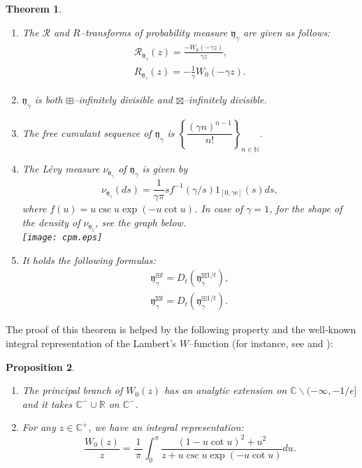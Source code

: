 \documentclass[12pt]{amsart}
\newtheorem{thm}{Theorem}[section]
\newtheorem{prop}[thm]{Proposition}
\theoremstyle{definition}
\numberwithin{equation}{section}
\begin{document}
\begin{thm}
\begin{enumerate}
	\item[\rm{(1)}] The $\mathcal{R}$ and $R$--transforms
	of probability measure $\mathfrak{y}_{\gamma}$ 
	are given as follows:
	\begin{align*}
	&\mathcal{R}_{\mathfrak{y}_{\gamma}}(z) 
	=\frac{-W_{0}(-\gamma z)}{\gamma z},&\\
	&R_{\mathfrak{y}_{\gamma}}(z) = -\frac{1}{\gamma}W_{0}(-\gamma z) .&
	\end{align*}

	\item[\rm{(2)}]
	$\mathfrak{y}_{\gamma}$ is both $\boxplus$--infinitely divisible and $\boxtimes$--infinitely divisible.
	\item[\rm{(3)}]
	The free cumulant sequence of 
	$\mathfrak{y_{\gamma}}$ is $\left\{ \dfrac{(\gamma n)^{n-1}}{n!}\right\}_{n\in{\mathbb{N}}}$.

	\item[\rm{(4)}]
	
	The L\'evy measure $\nu_{\mathfrak{y}_{\gamma}}$ 
	of $\mathfrak{y}_{\gamma}$ is given by
		\[
		\nu_{\mathfrak{y}_{\gamma}}(ds) 
		=\frac{1}{\gamma\pi}sf^{-1}(\gamma /s)1_{[0,\gamma \mathrm{e}]}(s)ds,
		\] 
		where $f(u)=u\csc u \exp (-u\cot u)$.
		In case of $\gamma=1$, 
		for the shape of the density of 
		$\nu_{\mathfrak{y}_{1}}$,
		 see the graph below.\\
	\texttt{[image: cpm.eps]}\\
	\item[\rm{(5)}]
	It holds the following formulas:
	\begin{align*}
	&\mathfrak{y}_{\gamma}^{\boxplus t}
	= D_{t}(\mathfrak{y}_{\gamma}^{\boxtimes 1/t}),&\\
	&\mathfrak{y}_{\gamma}^{\boxtimes t} 
	= D_{t}(\mathfrak{y}_{\gamma}^{\boxplus 1/t}).&
	\end{align*}
\end{enumerate}
\end{thm}
The proof of this theorem is helped by 
the following property and the well-known integral representation of 
the Lambert's $W$--function (for instance, see \cite[Section 4]{Cetc96} and \cite[Theorem 3.1]{KJCB11}):
\begin{prop}\label{int}
\begin{enumerate}[{\rm (1)}]
\item
The principal branch of $W_{0}(z)$ has an analytic extension on $\mathbb{C} \backslash (-\infty, -1/e]$ 
and it takes ${\mathbb{C}}^- \cup {\mathbb{R}}$ on ${\mathbb{C}}^{-}$.  
\item
For any $z \in {\mathbb{C}}^{+}$, we have an integral representation:
\[
\frac{W_{0}(z)}{z}
=\dfrac{1}{\, \pi \, }
\int_{0}^{\pi}\frac{(1-u\cot u)^2+u^2}{z+u\csc u \exp (-u\cot u)}du.
\]
\end{enumerate}
\end{prop}
\end{document}

